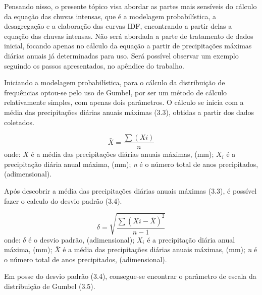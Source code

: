 Pensando nisso, o presente tópico visa abordar as partes mais sensíveis do cálculo da equação das chuvas intensas, que é a modelagem probabilística, a desagregação e a elaboração das curvas IDF, encontrando a partir delas a equação das chuvas intensas. Não será abordada a parte de tratamento de dados inicial, focando apenas no cálculo da equação a partir de precipitações máximas diárias anuais já determinadas para uso. Será possível observar um exemplo seguindo os passos apresentados, no apêndice do trabalho. \bigskip


Iniciando a modelagem probabilística, para o cálculo da distribuição de frequências optou-se pelo uso de Gumbel, por ser um método de cálculo relativamente simples, com apenas dois parâmetros. O cálculo se inicia com a média das precipitações diárias anuais máximas (3.3), obtidas a partir dos dados coletados.\bigskip

\newpage

\begin{equation}
\bar{X} = \frac{\sum(Xi)}{n}
\end{equation}
\newline
onde:
\newline
$\bar{X}$ é a média das precipitações diárias anuais máximas, (mm);
\newline
$X_i$ é a precipitação diária anual máxima, (mm);
\newline
\textit{n} é o número total de anos precipitados, (adimensional).\bigskip
 
Após descobrir a média das precipitações diárias anuais máximas (3.3), é possível fazer o calculo do desvio padrão (3.4).\bigskip

\begin{equation}
\delta = \sqrt{\frac{\sum(Xi - \bar{X})^2}{n - 1}}
\end{equation}
\newline
onde:
\newline
$\delta$ é o desvio padrão, (adimensional);
\newline
$X_i$ é a precipitação diária anual máxima, (mm);
\newline
$\bar{X}$ é a média das precipitações diárias anuais máximas, (mm);
\newline
\textit{n} é o número total de anos precipitados, (adimensional).\bigskip

Em posse do desvio padrão (3.4), consegue-se encontrar o parâmetro de escala da distribuição de Gumbel (3.5).\bigskip

